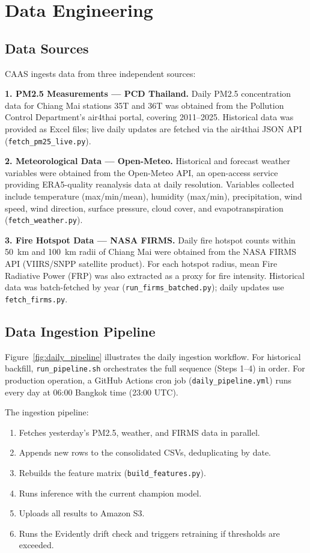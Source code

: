 \chapter{Data Engineering}
\label{ch:data-engineering}

\section{Data Sources}

CAAS ingests data from three independent sources:

\textbf{1. PM2.5 Measurements — PCD Thailand.}
Daily PM2.5 concentration data for Chiang Mai stations 35T and 36T was obtained
from the Pollution Control Department's air4thai portal, covering 2011--2025.
Historical data was provided as Excel files; live daily updates are fetched via
the air4thai JSON API (\texttt{fetch\_pm25\_live.py}).

\textbf{2. Meteorological Data — Open-Meteo.}
Historical and forecast weather variables were obtained from the Open-Meteo API,
an open-access service providing ERA5-quality reanalysis data at daily resolution.
Variables collected include temperature (max/min/mean), humidity (max/min),
precipitation, wind speed, wind direction, surface pressure, cloud cover, and
evapotranspiration (\texttt{fetch\_weather.py}).

\textbf{3. Fire Hotspot Data — NASA FIRMS.}
Daily fire hotspot counts within 50~km and 100~km radii of Chiang Mai were
obtained from the NASA FIRMS API (VIIRS/SNPP satellite product). For each
hotspot radius, mean Fire Radiative Power (FRP) was also extracted as a proxy
for fire intensity. Historical data was batch-fetched by year
(\texttt{run\_firms\_batched.py}); daily updates use \texttt{fetch\_firms.py}.

\section{Data Ingestion Pipeline}

Figure~\ref{fig:daily_pipeline} illustrates the daily ingestion workflow.
For historical backfill, \texttt{run\_pipeline.sh} orchestrates the full sequence
(Steps 1--4) in order. For production operation, a GitHub Actions cron job
(\texttt{daily\_pipeline.yml}) runs every day at 06:00 Bangkok time (23:00 UTC).

The ingestion pipeline:
\begin{enumerate}
    \item Fetches yesterday's PM2.5, weather, and FIRMS data in parallel.
    \item Appends new rows to the consolidated CSVs, deduplicating by date.
    \item Rebuilds the feature matrix (\texttt{build\_features.py}).
    \item Runs inference with the current champion model.
    \item Uploads all results to Amazon S3.
    \item Runs the Evidently drift check and triggers retraining if thresholds are exceeded.
\end{enumerate}

